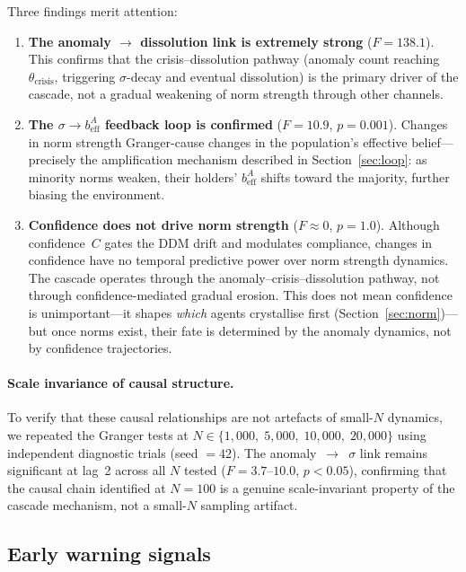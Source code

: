 \documentclass[11pt,a4paper]{article}
\begin{document}
Three findings merit attention:
\begin{enumerate}[nosep]
\item \textbf{The anomaly $\to$ dissolution link is extremely strong} ($F = 138.1$). This confirms that the crisis--dissolution pathway (anomaly count reaching $\theta_{\mathrm{crisis}}$, triggering $\sigma$-decay and eventual dissolution) is the primary driver of the cascade, not a gradual weakening of norm strength through other channels.

\item \textbf{The $\sigma \to b_{\mathrm{eff}}^A$ feedback loop is confirmed} ($F = 10.9$, $p = 0.001$). Changes in norm strength Granger-cause changes in the population's effective belief---precisely the amplification mechanism described in Section~\ref{sec:loop}: as minority norms weaken, their holders' $b_{\mathrm{eff}}^A$ shifts toward the majority, further biasing the environment.

\item \textbf{Confidence does not drive norm strength} ($F \approx 0$, $p = 1.0$). Although confidence~$C$ gates the DDM drift and modulates compliance, changes in confidence have no temporal predictive power over norm strength dynamics. The cascade operates through the anomaly--crisis--dissolution pathway, not through confidence-mediated gradual erosion. This does not mean confidence is unimportant---it shapes \emph{which} agents crystallise first (Section~\ref{sec:norm})---but once norms exist, their fate is determined by the anomaly dynamics, not by confidence trajectories.
\end{enumerate}

\paragraph{Scale invariance of causal structure.} To verify that these causal relationships are not artefacts of small-$N$ dynamics, we repeated the Granger tests at $N \in \{1{,}000,\; 5{,}000,\; 10{,}000,\; 20{,}000\}$ using independent diagnostic trials (seed $= 42$). The anomaly~$\to$~$\sigma$ link remains significant at lag~2 across all $N$ tested ($F = 3.7$--$10.0$, $p < 0.05$), confirming that the causal chain identified at $N = 100$ is a genuine scale-invariant property of the cascade mechanism, not a small-$N$ sampling artifact.

\subsection{Early warning signals}
\end{document}
